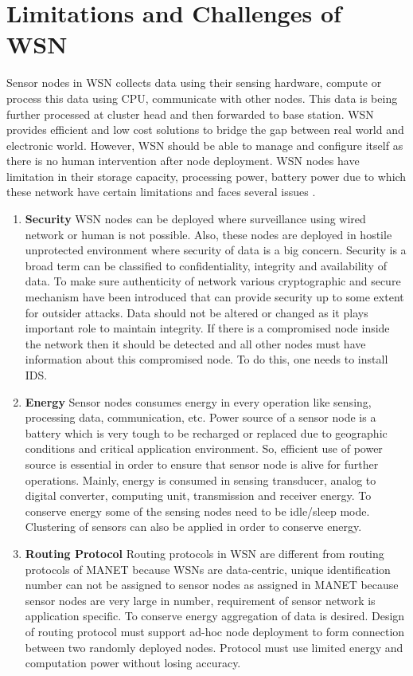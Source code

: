 \section{Limitations and Challenges of WSN} \label{WSNChallenges}
Sensor nodes in WSN collects data using their sensing hardware, compute or process this data using CPU, communicate with other nodes. This data is being further processed at cluster head and then forwarded to base station. WSN provides efficient and low cost solutions to bridge the gap between real world and electronic world. However, WSN should be able to manage and configure itself as there is no human intervention after node deployment. WSN nodes have limitation in their storage capacity, processing power, battery power due to which these network have certain limitations and faces several issues \cite{sharma2013issues}.
\begin{enumerate}[label=\textbf{\roman*.}]
    \item \textbf{Security }
    WSN nodes can be deployed where surveillance using wired network or human is not possible. Also, these nodes are deployed in hostile unprotected environment where security of data is a big concern. Security is a broad term can be classified to confidentiality, integrity and availability of data. To make sure authenticity of network various cryptographic and secure mechanism have been introduced that can provide security up to some extent for outsider attacks. Data should not be altered or changed as it plays important role to maintain integrity. If there is a compromised node inside the network then it should be detected and all other nodes must have information about this compromised node. To do this, one needs to install IDS.
    \item \textbf{Energy }
    Sensor nodes consumes energy in every operation like sensing, processing data, communication, etc. Power source of a sensor node is a battery which is very tough to be recharged or replaced due to geographic conditions and critical application environment. So, efficient use of power source is essential in order to ensure that sensor node is alive for further operations. Mainly, energy is consumed in sensing transducer, analog to digital converter, computing unit, transmission and receiver energy. To conserve energy some of the sensing nodes need to be idle/sleep mode. Clustering of sensors can also be applied in order to conserve energy.
    \item \textbf{Routing Protocol }
    Routing protocols in WSN are different from routing protocols of MANET because WSNs are data-centric, unique identification number can not be assigned to sensor nodes as assigned in MANET because sensor nodes are very large in number, requirement of sensor network is application specific. To conserve energy aggregation of data is desired. Design of routing protocol must support ad-hoc node deployment to form connection between two randomly deployed nodes. Protocol must use limited energy and computation power without losing accuracy.

\end{enumerate}
